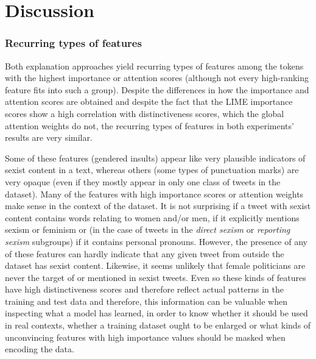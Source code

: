 \section{Discussion}
\label{sec:tweets-discussion}


\subsubsection{Recurring types of features}

Both explanation approaches yield recurring types of features among the tokens with the highest importance or attention scores (although not every high-ranking feature fits into such a group).
Despite the differences in how the importance and attention scores are obtained and despite the fact that the LIME importance scores show a high correlation with distinctiveness scores, which the global attention weights do not, the recurring types of features in both experiments' results are very similar.

Some of these features (gendered insults) appear like very plausible indicators of sexist content in a text, whereas others (some types of punctuation marks) are very opaque (even if they mostly appear in only one class of tweets in the dataset). 
Many of the features with high importance scores or attention weights make sense in the context of the dataset.
It is not surprising if a tweet with sexist content contains words relating to women and/or men, if it explicitly mentions sexism or feminism or (in the case of tweets in the \textit{direct sexism} or \textit{reporting sexism} subgroups) if it contains personal pronouns.
However, the presence of any of these features can hardly indicate that any given tweet from outside the dataset has sexist content.
Likewise, it seems unlikely that female politicians are never the target of or mentioned in sexist tweets.
Even so these kinds of features have high distinctiveness scores and therefore reflect actual patterns in the training and test data and therefore, this information can be valuable when inspecting what a model has learned, in order to know whether it should be used in real contexts, whether a training dataset ought to be enlarged or what kinds of unconvincing features with high importance values should be masked when encoding the data.

